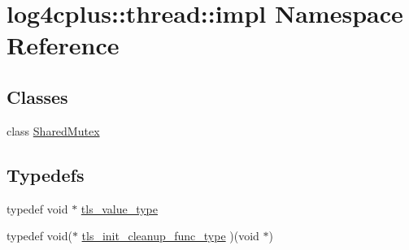 \hypertarget{namespacelog4cplus_1_1thread_1_1impl}{\section{log4cplus\-:\-:thread\-:\-:impl Namespace Reference}
\label{namespacelog4cplus_1_1thread_1_1impl}
}
\subsection*{Classes}
\begin{DoxyCompactItemize}
\item 
class \hyperlink{classlog4cplus_1_1thread_1_1impl_1_1SharedMutex}{Shared\-Mutex}
\end{DoxyCompactItemize}
\subsection*{Typedefs}
\begin{DoxyCompactItemize}
\item 
typedef void $\ast$ \hyperlink{namespacelog4cplus_1_1thread_1_1impl_a7964c384af774778b462bec9cc6581ea}{tls\-\_\-value\-\_\-type}
\item 
typedef void($\ast$ \hyperlink{namespacelog4cplus_1_1thread_1_1impl_a4a2c43d8790236ed72370694f70a08c2}{tls\-\_\-init\-\_\-cleanup\-\_\-func\-\_\-type} )(void $\ast$)
\end{DoxyCompactItemize}
